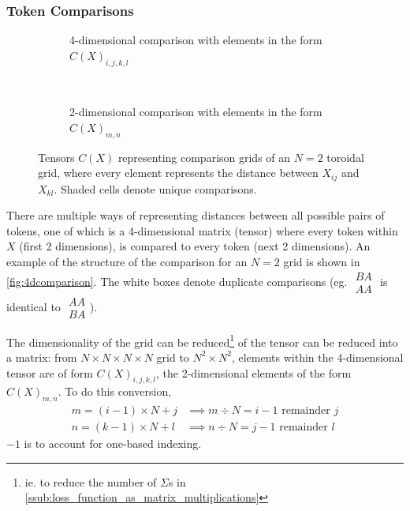 \subsubsection{Token Comparisons}%
\label{ssub:token_comparisons}
\begin{figure}[htpb]
    \centering
    \begin{subfigure}[t]{0.5\textwidth}
    \begin{center}
    \end{center}
    \caption{4-dimensional comparison with elements in the form $C(X)_{i,j,k,l}$}
    \label{fig:4dcomparison}
    \end{subfigure}%
    ~
    \begin{subfigure}[t]{0.5\textwidth}
    \begin{center}
    \end{center}
    \caption{2-dimensional comparison with elements in the form $C(X)_{m,n}$}
    \label{fig:2dcomparison}
    \end{subfigure}

    \caption{Tensors $C(X)$ representing comparison grids of an $N=2$ toroidal grid, where every element represents the distance between $X_{ij}$ and $X_{kl}$. Shaded cells denote unique comparisons.}%
    \label{fig:comparisonGrids}
\end{figure}

There are multiple ways of representing distances between all possible pairs of tokens, one of which is a 4-dimensional matrix (tensor) where every token within $X$ (first 2 dimensions), is compared to every token (next 2 dimensions). An example of the structure of the comparison for an $N=2$ grid is shown in \autoref{fig:4dcomparison}. The white boxes denote duplicate comparisons (eg. $
\begin{smallmatrix}
    BA\\ AA
\end{smallmatrix}
$ is identical to
$
\begin{smallmatrix}
    AA\\ BA
\end{smallmatrix}
$).

The dimensionality of the grid can be reduced\footnote{ie. to reduce the number of $\Sigma$s in \ref{ssub:loss_function_as_matrix_multiplications}} of the tensor can be reduced into a matrix: from $N\times N\times N\times N$ grid to $N^2\times N^2$, elements within the 4-dimensional tensor are of form $C(X)_{i,j,k,l}$, the 2-dimensional elements of the form $C(X)_{m,n}$. To do this conversion,
\begin{align*}
    m=(i-1)\times N+j &\implies m\div N=i-1 \text{ remainder } j\\
    n=(k-1)\times N+l &\implies n\div N=j-1 \text{ remainder } l
\end{align*}
$-1$ is to account for one-based indexing.

